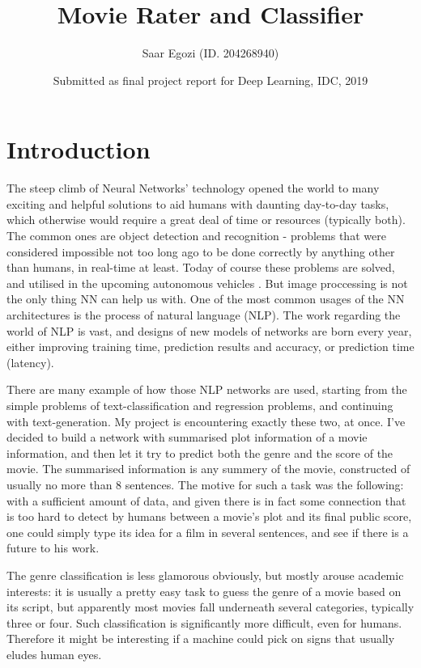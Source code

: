 \documentclass[11pt]{article}
\title{Movie Rater and Classifier}
\author{Saar Egozi (ID. 204268940)}
\date{Submitted as final project report for Deep Learning, IDC, 2019}
\begin{document}
\maketitle

\section{Introduction}
The steep climb of Neural Networks' technology opened the world to many exciting and helpful solutions to aid humans with daunting day-to-day tasks, which otherwise would require a great deal of time or resources (typically both). 
The common ones are object detection and recognition - problems that were considered impossible not too long ago to be done correctly by anything other than humans, in real-time at least.  
Today of course these problems are solved, and utilised in the upcoming autonomous vehicles \citep{pomerleau1991efficient,de1994neural}.
But image proccessing is not the only thing NN can help us with. 
One of the most common usages of the NN architectures is the process of natural language (NLP).
The work regarding the world of NLP is vast, and designs of new models of networks are born every year, either improving training time, prediction results and accuracy, or prediction time (latency).

There are many example of how those NLP networks are used, starting from the simple problems of text-classification and regression problems, and continuing with text-generation.
My project is encountering exactly these two, at once.
I've decided to build  a network with summarised plot information of a movie information, and then let it try to predict both the genre and the score of the movie.
The summarised information is any summery of the movie, constructed of usually no more than 8 sentences.
The motive for such a task was the following: with a sufficient amount of data, and given there is in fact some connection that is too hard to detect by humans between a movie's plot and its final public score, one could simply type its idea for a film in several sentences, and see if there is a future to his work.

The genre classification is less glamorous obviously, but mostly arouse academic interests: it is usually a pretty easy task to guess the genre of a movie based on its script, but apparently most movies fall underneath several categories, typically three or four. 
Such classification is significantly more difficult, even for humans. Therefore it might be interesting if a machine could pick on signs that usually eludes human eyes.
\end{document}
